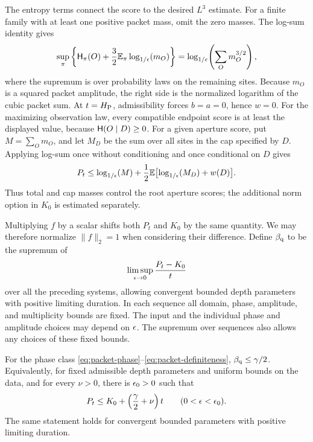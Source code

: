 The entropy terms connect the score to the desired \(L^3\) estimate.
For a finite family with at least one positive packet mass, omit the
zero masses. The log-sum identity gives
\[
 \sup_{\pi}\left\{\mathsf H_\pi(O)
       +\frac32\mathbb E_\pi\log_{1/\epsilon}\!\left(m_O\right)\right\}
 =\log_{1/\epsilon}\!\left(\sum_Om_O^{3/2}\right),
\]
where the supremum is over probability laws on the remaining sites.
Because \(m_O\) is a squared packet amplitude, the right side is the
normalized logarithm of the cubic packet sum. At \(t=H_{\mathrm P}\),
admissibility forces \(b=a=0\), hence \(w=0\). For the maximizing
observation law, every compatible endpoint score is at least the
displayed value, because \(\mathsf H(O\mid D)\ge0\).
For a given aperture score, put \(M=\sum_Om_O\), and let \(M_D\) be the
sum over all sites in the cap specified by \(D\). Applying log-sum once
without conditioning and once conditional on \(D\) gives
\[
 P_t\le \log_{1/\epsilon}\!\left(M\right)
       +\frac12\mathbb E\bigl[\log_{1/\epsilon}\!\left(M_D\right)+w(D)\bigr].
\]
Thus total and cap masses control the root aperture scores; the
additional norm option in \(K_0\) is estimated separately.

Multiplying \(f\) by a scalar shifts both \(P_t\) and \(K_0\) by the
same quantity.  We may therefore normalize \(\|f\|_2=1\) when considering
their difference.  Define \(\beta_{\mathrm q}\) to be the supremum of
\begin{equation}
 \limsup_{\epsilon\to0}\frac{P_t-K_0}{t}
 \label{eq:packet-growth-supremum}
\end{equation}
over all the preceding systems, allowing convergent bounded depth
parameters with positive limiting duration.  In each sequence all
domain, phase, amplitude, and multiplicity bounds are fixed.  The
input and the individual phase and amplitude choices may depend on
\(\epsilon\).  The supremum over sequences also allows any choices of
these fixed bounds.

\begin{theorem}
\label{thm:packet-growth}
For the phase class \eqref{eq:packet-phase}--\eqref{eq:packet-definiteness},
\(\beta_{\mathrm q}\le\gamma/2\).  Equivalently, for fixed admissible depth
parameters and uniform bounds on the data, and for every \(\nu>0\),
there is \(\epsilon_0>0\) such that
\begin{equation}
 P_t\le K_0+\left(\frac\gamma2+\nu\right)t
 \qquad(0<\epsilon<\epsilon_0).
 \label{eq:packet-growth-finite}
\end{equation}
The same statement holds for convergent bounded parameters with
positive limiting duration.
\end{theorem}

